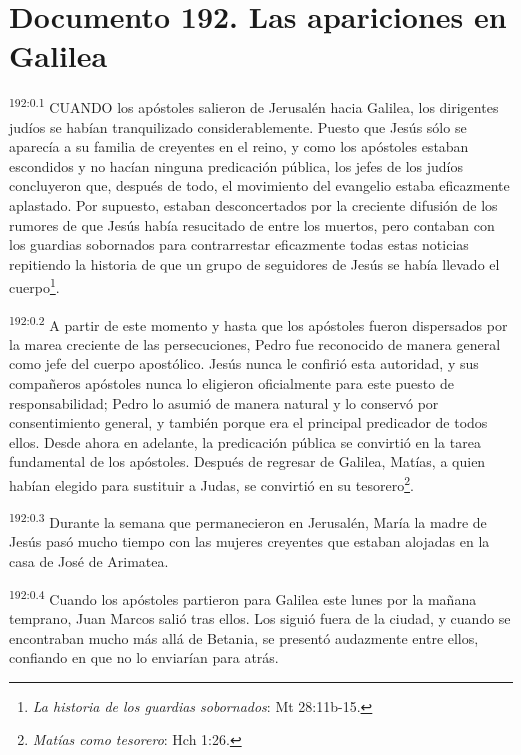\chapter{Documento 192. Las apariciones en Galilea}
\par
\textsuperscript{192:0.1} CUANDO los apóstoles salieron de Jerusalén hacia Galilea, los dirigentes judíos se habían tranquilizado considerablemente. Puesto que Jesús sólo se aparecía a su familia de creyentes en el reino, y como los apóstoles estaban escondidos y no hacían ninguna predicación pública, los jefes de los judíos concluyeron que, después de todo, el movimiento del evangelio estaba eficazmente aplastado. Por supuesto, estaban desconcertados por la creciente difusión de los rumores de que Jesús había resucitado de entre los muertos, pero contaban con los guardias sobornados para contrarrestar eficazmente todas estas noticias repitiendo la historia de que un grupo de seguidores de Jesús se había llevado el cuerpo\footnote{\textit{La historia de los guardias sobornados}: Mt 28:11b-15.}.

\par
\textsuperscript{192:0.2} A partir de este momento y hasta que los apóstoles fueron dispersados por la marea creciente de las persecuciones, Pedro fue reconocido de manera general como jefe del cuerpo apostólico. Jesús nunca le confirió esta autoridad, y sus compañeros apóstoles nunca lo eligieron oficialmente para este puesto de responsabilidad; Pedro lo asumió de manera natural y lo conservó por consentimiento general, y también porque era el principal predicador de todos ellos. Desde ahora en adelante, la predicación pública se convirtió en la tarea fundamental de los apóstoles. Después de regresar de Galilea, Matías, a quien habían elegido para sustituir a Judas, se convirtió en su tesorero\footnote{\textit{Matías como tesorero}: Hch 1:26.}.

\par
\textsuperscript{192:0.3} Durante la semana que permanecieron en Jerusalén, María la madre de Jesús pasó mucho tiempo con las mujeres creyentes que estaban alojadas en la casa de José de Arimatea.

\par
\textsuperscript{192:0.4} Cuando los apóstoles partieron para Galilea este lunes por la mañana temprano, Juan Marcos salió tras ellos. Los siguió fuera de la ciudad, y cuando se encontraban mucho más allá de Betania, se presentó audazmente entre ellos, confiando en que no lo enviarían para atrás.


